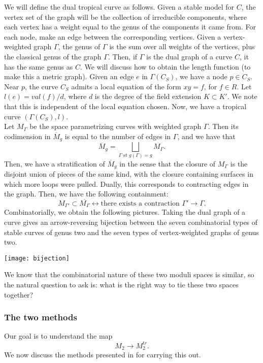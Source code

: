 We will define the dual tropical curve as follows. Given a stable model for $C$, the vertex set of the graph will be the collection of irreducible components, where each vertex has a weight equal to the genus of the components it came from. For each node, make an edge between the corresponding vertices. Given a vertex-weighted graph $\Gamma$, the genus of $\Gamma$ is the sum over all weights of the vertices, plus the classical genus of the graph $\Gamma$. Then, if $\Gamma$ is the dual graph of a curve $C$, it has the same genus as $C$. We will discuss how to obtain the length function (to make this a metric graph).
Given an edge $e$ in $\Gamma(C_S)$, we have a node $p \in C_S$. Near $p$, the curve $C_S$ admits a local equation of the form $xy=f$, for $f \in R$. Let $l(e) = val(f)/d$, where $d$ is the degree of the field extension $K \subset K'$. We note that this is independent of the local equation chosen. Now, we have a tropical curve $(\Gamma(C_S), l)$. \\

 Let $M_{\Gamma}$ be the space parametrizing curves with weighted graph $\Gamma$. Then its codimension in $\overline{M}_g$ is equal to the number of edges in $\Gamma$, and we have that
$$
\overline{M}_g = \bigsqcup_{\Gamma\text{ st }g(\Gamma)=g} M_\Gamma.
$$
Then, we have a stratification of $\overline{M}_g$ in the sense that the closure of $M_{\Gamma}$ is the disjoint union of pieces of the same kind, with the closure containing surfaces in which more loops were pulled. Dually, this corresponds to contracting edges in the graph. Then, we have the following containment:
$$
M_{\Gamma'} \subset \overline{M_\Gamma} \leftrightarrow \text{there exists a contraction $\Gamma' \rightarrow \Gamma$}.
$$
Combinatorially, we obtain the following pictures. Taking the dual graph of a curve gives an arrow-reversing bijection between the seven combinatorial types of stable curves of genus two and the seven types of vertex-weighted graphs of genus two.
\begin{center}
  \texttt{[image: bijection]}
\end{center}
We know that the combinatorial nature of these two moduli spaces is similar, so the natural question to ask is: what is the right way to tie these two spaces together?

\newpage
\subsubsection{The two methods}
Our goal is to understand the map
$$
M_2 \rightarrow M_2^{tr}.
$$
We now discuss the methods presented in \cite{section5} for carrying this out.


